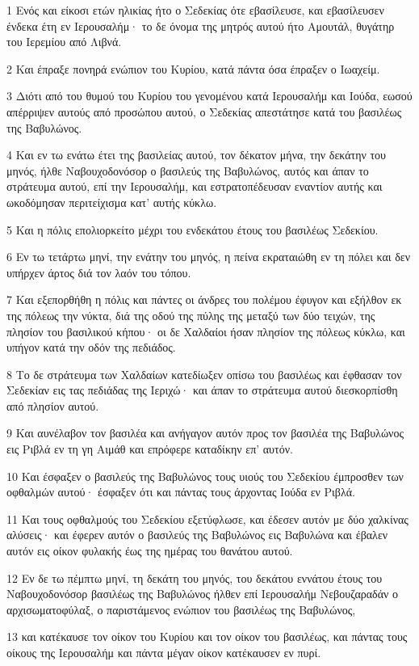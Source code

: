 \par 1 Ενός και είκοσι ετών ηλικίας ήτο ο Σεδεκίας ότε εβασίλευσε, και εβασίλευσεν ένδεκα έτη εν Ιερουσαλήμ· το δε όνομα της μητρός αυτού ήτο Αμουτάλ, θυγάτηρ του Ιερεμίου από Λιβνά.
\par 2 Και έπραξε πονηρά ενώπιον του Κυρίου, κατά πάντα όσα έπραξεν ο Ιωαχείμ.
\par 3 Διότι από του θυμού του Κυρίου του γενομένου κατά Ιερουσαλήμ και Ιούδα, εωσού απέρριψεν αυτούς από προσώπου αυτού, ο Σεδεκίας απεστάτησε κατά του βασιλέως της Βαβυλώνος.
\par 4 Και εν τω ενάτω έτει της βασιλείας αυτού, τον δέκατον μήνα, την δεκάτην του μηνός, ήλθε Ναβουχοδονόσορ ο βασιλεύς της Βαβυλώνος, αυτός και άπαν το στράτευμα αυτού, επί την Ιερουσαλήμ, και εστρατοπέδευσαν εναντίον αυτής και ωκοδόμησαν περιτείχισμα κατ' αυτής κύκλω.
\par 5 Και η πόλις επολιορκείτο μέχρι του ενδεκάτου έτους του βασιλέως Σεδεκίου.
\par 6 Εν τω τετάρτω μηνί, την ενάτην του μηνός, η πείνα εκραταιώθη εν τη πόλει και δεν υπήρχεν άρτος διά τον λαόν του τόπου.
\par 7 Και εξεπορθήθη η πόλις και πάντες οι άνδρες του πολέμου έφυγον και εξήλθον εκ της πόλεως την νύκτα, διά της οδού της πύλης της μεταξύ των δύο τειχών, της πλησίον του βασιλικού κήπου· οι δε Χαλδαίοι ήσαν πλησίον της πόλεως κύκλω, και υπήγον κατά την οδόν της πεδιάδος.
\par 8 Το δε στράτευμα των Χαλδαίων κατεδίωξεν οπίσω του βασιλέως και έφθασαν τον Σεδεκίαν εις τας πεδιάδας της Ιεριχώ· και άπαν το στράτευμα αυτού διεσκορπίσθη από πλησίον αυτού.
\par 9 Και αυνέλαβον τον βασιλέα και ανήγαγον αυτόν προς τον βασιλέα της Βαβυλώνος εις Ριβλά εν τη γη Αιμάθ και επρόφερε καταδίκην επ' αυτόν.
\par 10 Και έσφαξεν ο βασιλεύς της Βαβυλώνος τους υιούς του Σεδεκίου έμπροσθεν των οφθαλμών αυτού· έσφαξεν ότι και πάντας τους άρχοντας Ιούδα εν Ριβλά.
\par 11 Και τους οφθαλμούς του Σεδεκίου εξετύφλωσε, και έδεσεν αυτόν με δύο χαλκίνας αλύσεις· και έφερεν αυτόν ο βασιλεύς της Βαβυλώνος εις Βαβυλώνα και έβαλεν αυτόν εις οίκον φυλακής έως της ημέρας του θανάτου αυτού.
\par 12 Εν δε τω πέμπτω μηνί, τη δεκάτη του μηνός, του δεκάτου εννάτου έτους του Ναβουχοδονόσορ βασιλέως της Βαβυλώνος ήλθεν επί Ιερουσαλήμ Νεβουζαραδάν ο αρχισωματοφύλαξ, ο παριστάμενος ενώπιον του βασιλέως της Βαβυλώνος,
\par 13 και κατέκαυσε τον οίκον του Κυρίου και τον οίκον του βασιλέως, και πάντας τους οίκους της Ιερουσαλήμ και πάντα μέγαν οίκον κατέκαυσεν εν πυρί.
